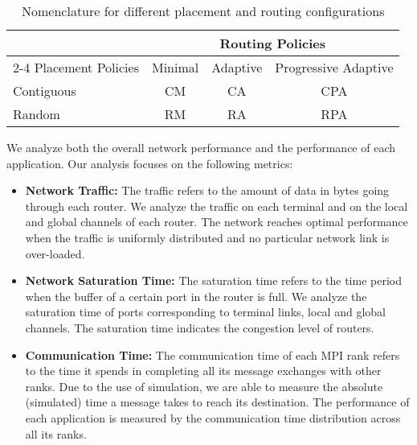 \begin{table}[ht]
\begin{center}
\caption{Nomenclature for different placement and routing configurations} 
\label{tab: placement routing configs}
\begin{tabular}{l c c c }
\toprule %
\toprule
&\multicolumn{3}{c}{Routing Policies} \\ 
\cmidrule(l){2-4}
Placement Policies & Minimal & Adaptive & Progressive Adaptive\\ %
\midrule %
Contiguous  &  CM   &   CA   &  CPA   \\ %
\midrule
Random  &   RM  &   RA   &  RPA   \\ 
\midrule %
\bottomrule %
\end{tabular}
\end{center}
\end{table}


We analyze both the overall network performance and the performance of each application.
Our analysis focuses on the following metrics:
\begin{itemize}

    \item \textbf{Network Traffic:} The traffic refers to the amount of data in bytes going through each router. We analyze the traffic on each terminal and on the local and global channels of each router. The network reaches optimal performance when the traffic is uniformly distributed and no particular network link is over-loaded. 
            
    \item \textbf{Network Saturation Time:} The saturation time refers to the time period when the buffer of a certain port in the router is full. We analyze the saturation time of ports corresponding to terminal links, local and global channels. The saturation time indicates the congestion level of routers. 
    
    \item \textbf{Communication Time:} The communication time of each MPI rank refers to the time it spends in completing all its message exchanges with other ranks. Due to the use of simulation, we are able to measure the absolute (simulated) time a message takes to reach its destination. The performance of each application is measured by the communication time distribution across all its ranks.    
    
    \end{itemize}

